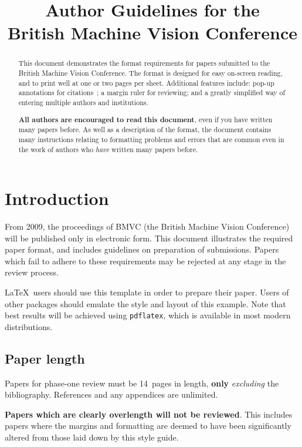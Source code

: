 \documentclass{bmvc2k}
\title{Author Guidelines for the\\ British Machine Vision Conference}
\begin{document}
\maketitle

\begin{abstract}
This document demonstrates the format requirements for papers submitted
to the British Machine Vision Conference.  The format is designed for
easy on-screen reading, and to print well at one or two pages per sheet.
Additional features include: pop-up annotations for
citations~\cite{Authors06,Mermin89}; a margin ruler for reviewing; and a
greatly simplified way of entering multiple authors and institutions.

{\bf All authors are encouraged to read this document}, even if you have
written many papers before.  As well as a description of the format, the
document contains many instructions relating to formatting problems and
errors that are common even in the work of authors who {\em have}
written many papers before.
\end{abstract}

\section{Introduction}
\label{sec:intro}
From 2009, the proceedings of BMVC (the British Machine Vision
Conference) will be published only in electronic form.  This document
illustrates the required paper format, and includes guidelines on
preparation of submissions.  Papers which fail to adhere to these
requirements may be rejected at any stage in the review process.

\LaTeX\ users should use this template in order to prepare their paper.
Users of other packages should emulate the style and layout of this
example.  Note that best results will be achieved using {\tt pdflatex},
which is available in most modern distributions.

\subsection{Paper length}
Papers for phase-one review must be 14~pages in length, {\bf only} {\em excluding} the bibliography.
References and any appendices are unlimited.


{\bf Papers which are
clearly overlength will not be reviewed}.  This includes papers where the
margins and formatting are deemed to have been significantly altered from
those laid down by this style guide.
\end{document}
